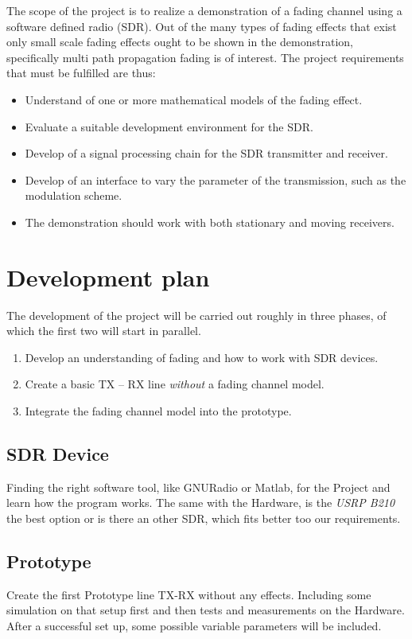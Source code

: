\documentclass[a4paper, twosided, 11pt]{scrartcl}
\begin{document}
The scope of the project is to realize a demonstration of a fading channel using a software defined radio (SDR).
Out of the many types of fading effects that exist only small scale fading effects ought to be shown in the demonstration, specifically multi path propagation fading is of interest.
The project requirements that must be fulfilled are thus:
\begin{itemize}
	\item Understand of one or more mathematical models of the fading effect.
	\item Evaluate a suitable development environment for the SDR.
	\item Develop of a signal processing chain for the SDR transmitter and receiver.
	\item Develop of an interface to vary the parameter of the transmission, such as the modulation scheme.
	\item The demonstration should work with both stationary and moving receivers.
\end{itemize}

\section{Development plan}

The development of the project will be carried out roughly in three phases, of which the first two will start in parallel.
\begin{enumerate}
	\item Develop an understanding of fading and how to work with SDR devices.
	\item Create a basic TX -- RX line \emph{without} a fading channel model.
	\item Integrate the fading channel model into the prototype.
\end{enumerate}

\subsection{SDR Device}
Finding the right software tool, like GNURadio or Matlab, for the Project and learn how the program works. The same with the Hardware, is the \textit{USRP B210} the best option or is there an other SDR, which fits better too our requirements. 

\subsection{Prototype}
Create the first Prototype line TX-RX without any effects. Including some simulation on that setup first and then tests and measurements on the Hardware. 
After a successful set up, some possible variable parameters will be included. 
\end{document}

